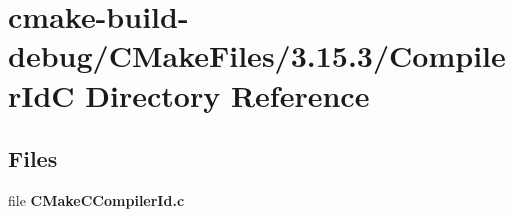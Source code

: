 \section{cmake-\/build-\/debug/\+C\+Make\+Files/3.15.3/\+Compiler\+IdC Directory Reference}
\label{dir_44ea9ed243d3740341f2efeb45271ac4}
\subsection*{Files}
\begin{DoxyCompactItemize}
\item 
file {\bf C\+Make\+C\+Compiler\+Id.\+c}
\end{DoxyCompactItemize}
